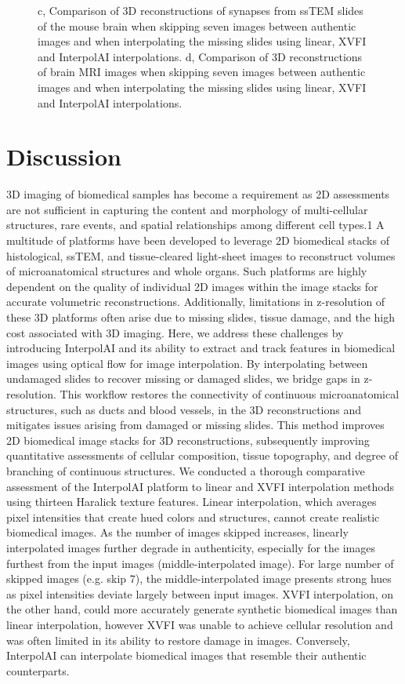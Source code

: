 \begin{refsection}
    \begin{figure}[h!]
        \ContinuedFloat
        \captionsetup{font=small}
        \caption[]{ c, Comparison
        of 3D reconstructions of synapses from ssTEM slides of the mouse brain when
        skipping seven images between authentic images and when interpolating the
        missing slides using linear, XVFI and InterpolAI interpolations. d, Comparison
        of 3D reconstructions of brain MRI images when skipping seven images between
        authentic images and when interpolating the missing slides using linear, XVFI and
        InterpolAI interpolations.}
    \end{figure}
    
    \section{Discussion}
    3D imaging of biomedical samples has become a requirement as 2D assessments are not sufficient in capturing the content and morphology of multi-cellular structures, rare events, and spatial relationships among different cell types.1 A multitude of platforms have been developed to leverage 2D biomedical stacks of histological, ssTEM, and tissue-cleared light-sheet images to reconstruct volumes of microanatomical structures and whole organs. Such platforms are highly dependent on the quality of individual 2D images within the image stacks for accurate volumetric reconstructions. Additionally, limitations in z-resolution of these 3D platforms often arise due to missing slides, tissue damage, and the high cost associated with 3D imaging. 
    Here, we address these challenges by introducing InterpolAI and its ability to extract and track features in biomedical images using optical flow for image interpolation. By interpolating between undamaged slides to recover missing or damaged slides, we bridge gaps in z-resolution. This workflow restores the connectivity of continuous microanatomical structures, such as ducts and blood vessels, in the 3D reconstructions and mitigates issues arising from damaged or missing slides. This method improves 2D biomedical image stacks for 3D reconstructions, subsequently improving quantitative assessments of cellular composition, tissue topography, and degree of branching of continuous structures.
    We conducted a thorough comparative assessment of the InterpolAI platform to linear and XVFI interpolation methods using thirteen Haralick texture features. Linear interpolation, which averages pixel intensities that create hued colors and structures, cannot create realistic biomedical images. As the number of images skipped increases, linearly interpolated images further degrade in authenticity, especially for the images furthest from the input images (middle-interpolated image). For large number of skipped images (e.g. skip 7), the middle-interpolated image presents strong hues as pixel intensities deviate largely between input images. XVFI interpolation, on the other hand, could more accurately generate synthetic biomedical images than linear interpolation, however XVFI was unable to achieve cellular resolution and was often limited in its ability to restore damage in images. Conversely, InterpolAI can interpolate biomedical images that resemble their authentic counterparts. 

\end{refsection}
